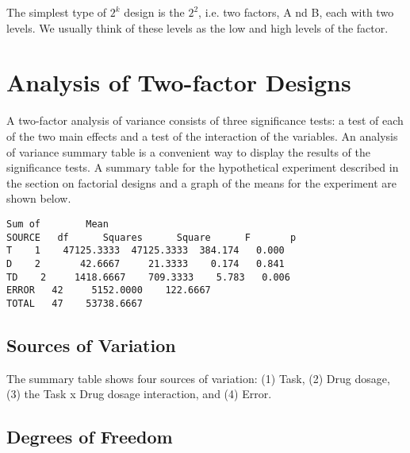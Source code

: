 The simplest type of $2^k$ design is the $2^2$, i.e. two factors, A nd B, each with two levels. We usually think of these levels as the low and high levels of the factor.


\section{Analysis of Two-factor Designs}

A two-factor analysis of variance consists of three significance tests: a test of each of the two main effects and a test of the interaction of the variables. An analysis of variance summary table is a convenient way to display the results of the significance tests. A summary table for the hypothetical experiment described in the section on factorial designs and a graph of the means for the experiment are shown below.

\begin{verbatim}
Sum of        Mean
SOURCE   df      Squares      Square      F       p
T    1    47125.3333  47125.3333  384.174   0.000
D    2       42.6667     21.3333    0.174   0.841
TD    2     1418.6667    709.3333    5.783   0.006
ERROR   42     5152.0000    122.6667
TOTAL   47    53738.6667
\end{verbatim}

\subsection{Sources of Variation}

The summary table shows four sources of variation: (1) Task, (2) Drug dosage, (3) the Task x Drug dosage interaction, and (4) Error.

\subsection{Degrees of Freedom}

